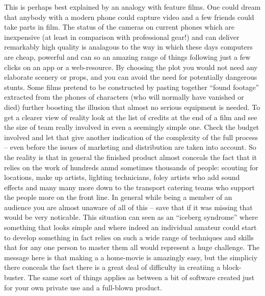 \begin{longdescription}
\item[A product vs.\ a personal project]
This is perhaps best explained by an analogy with feature films.
One could dream that anybody with a modern phone could capture video and
a few friends could take parts in film. The status of the cameras on current
phones which are inexpensive (at least in comparison with professional gear!)
and can deliver remarkably high quality is analagous to the way in
which these days computers are cheap, powerful and can so an amazing range of
things following just a few clicks on an app or a web-resource.
By choosing the plot you would not need any elaborate scenery or props,
and you can avoid the need for potentially dangerous stunts.
Some films pretend to be constructed by pasting together ``found footage''
extracted from the phones of characters (who will normally have vanished
or died) further boosting the illusion that almost no serious equipment
is needed. To get a clearer view of reality look at the list of credits
at the end of a film and see the size of team really involved in even a
seemingly simple one. Check the budget involved and let that give another
indication of the complexity of the full process -- even before the issues
of marketing and distribution are taken into account. So the reality is that
in general the finished product almost conceals the fact that it relies on the
work of hundreds anmd sometimes thousands of people: scouting for locations,
make up artists, lighting technicians, foley artists who add sound effects
and many many more down to the transport catering teams who support the
people more on the front line. In general while being a member of an audience
you are almost unaware of all of this -- save that if it was missing that
would be very noticable. This situation can seen as an ``iceberg syndrome''
where something that looks simple and where indeed an individual amateur
could start to develop something in fact relies on such a wide range
of techniques and skills that for any one person to master them all
would represent a huge challenge. The message here is that making a
a home-movie is amazingly easy, but the simpliciy there conceals the fact
there is a great deal of difficulty in creatiing a block-buster. The
same sort of things applies as between a bit of software created
just for your own private use and a full-blown product.


\item[Consideration of edge and worst cases]


\end{longdescription}
